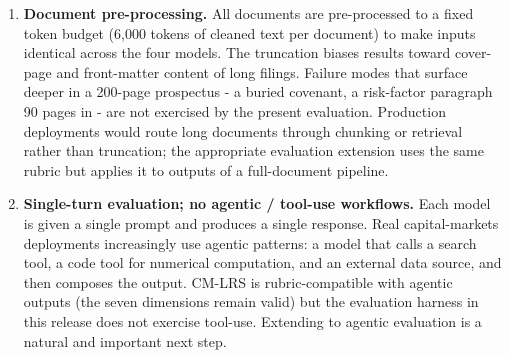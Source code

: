 \documentclass[11pt]{article}
\begin{document}
\begin{enumerate}[leftmargin=*,itemsep=0.2em]
\item \textbf{Document pre-processing.} All documents are pre-processed to a fixed token budget (6,000 tokens of cleaned text per document) to make inputs identical across the four models. The truncation biases results toward cover-page and front-matter content of long filings. Failure modes that surface deeper in a 200-page prospectus - a buried covenant, a risk-factor paragraph 90 pages in - are not exercised by the present evaluation. Production deployments would route long documents through chunking or retrieval rather than truncation; the appropriate evaluation extension uses the same rubric but applies it to outputs of a full-document pipeline.

\item \textbf{Single-turn evaluation; no agentic / tool-use workflows.} Each model is given a single prompt and produces a single response. Real capital-markets deployments increasingly use agentic patterns: a model that calls a search tool, a code tool for numerical computation, and an external data source, and then composes the output. CM-LRS is rubric-compatible with agentic outputs (the seven dimensions remain valid) but the evaluation harness in this release does not exercise tool-use. Extending to agentic evaluation is a natural and important next step.


\end{enumerate}
\end{document}
